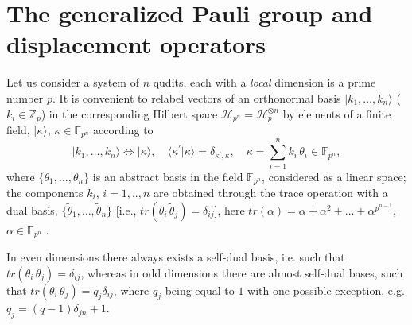 \documentclass{article}
\begin{document}
\section{The generalized Pauli group and displacement operators}

Let us consider a system of $n$ qudits, each with a \textit{local} dimension
is a prime number $p$. It is convenient to relabel vectors of an orthonormal
basis $|k_{1},\ldots ,k_{n}\rangle $ ($k_{i}\in \mathbb{Z}_{p}$) in the
corresponding Hilbert space $\mathcal{H}_{p^{n}}=\mathcal{H}_{p}^{\otimes n}$
by elements of a finite field, $|\kappa \rangle $, $\kappa \in \mathbb{F}%
_{p^{n}}$ according to 
\begin{equation}
|k_{1},\ldots ,k_{n}\rangle \Leftrightarrow |\kappa \rangle ,\quad \langle
\kappa ^{\prime }|\kappa \rangle =\delta _{\kappa ^{\prime },\kappa },\quad
\kappa =\sum_{i=1}^{n}k_{i}\,\theta _{i}\in \mathbb{F}_{p^{n}},
\label{basis}
\end{equation}%
where $\{\theta _{1},\ldots ,\theta _{n}\}$ is an abstract basis in the
field $\mathbb{F}_{p^{n}}$, considered as a linear space; the components $%
k_{i}$, $i=1,..,n$ are obtained through the trace operation with a dual
basis, $\{\tilde{\theta}_{1},\ldots ,\tilde{\theta}_{n}\}$ [i.e., $tr(\theta
_{i}\,\tilde{\theta}_{j})=\delta _{ij}$], here $tr(\alpha )=\alpha +\alpha
^{2}+\ldots +\alpha ^{p^{n-1}}$, $\alpha \in \mathbb{F}_{p^{n}}$ \cite{FF}.

In even dimensions there always exists a self-dual basis, i.e. such that $%
tr(\theta _{i}\,\theta _{j})=\delta _{ij}$, whereas in odd dimensions there
are almost self-dual bases, such that $tr(\theta _{i}\,\theta
_{j})=q_{j}\delta _{ij}$, where $q_{j}$ being equal to $1$ with one possible
exception, e.g. $q_{j}=(q-1)\delta _{jn}+1$.
\end{document}
